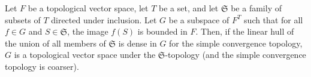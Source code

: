 Let \(F\) be a topological vector space, let \(T\) be a set, and let \(\mathfrak{S}\) be a family of subsets of \(T\) directed under inclusion. Let \(G\) be a subspace of \(F^T\) such that for all \(f \in G\) and \(S \in \mathfrak{S}\), the image \(f(S)\) is bounded in \(F\). Then, if the linear hull of the union of all members of \(\mathfrak{S}\) is dense in \(G\) for the simple convergence topology, \(G\) is a topological vector space under the \(\mathfrak{S}\)-topology (and the simple convergence topology is coarser).
